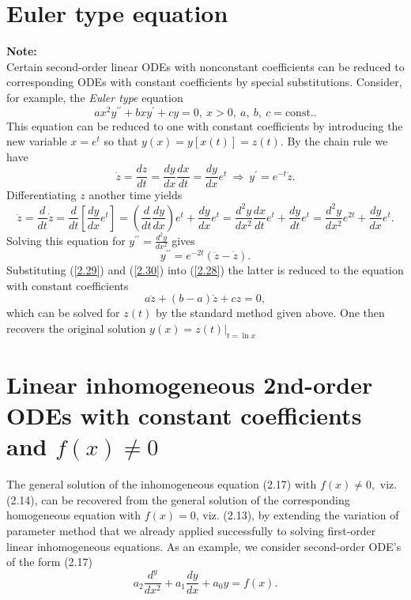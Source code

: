 \documentclass[11pt,a4paper]{article}
\begin{document}
	\mytitle
	\section{Euler type equation}
	\textbf{Note:}\\
	Certain second-order linear ODEs with nonconstant coefficients can be reduced to corresponding ODEs with constant coefficients by special substitutions. Consider, for example, the \textit{Euler type} equation
	\begin{equation}\label{2.28}
		ax^2y^{\prime\prime} + bxy^\prime +cy = 0,\ x>0,\ a,\ b,\ c = \text{const}..
	\end{equation}
	This equation can be reduced to one with constant coefficients by introducing the new variable $x = e^t$ so that $y(x) = y[x(t)] = z(t)$. By the chain rule we have
	\begin{equation}\label{2.29}
		\dot{z} = \frac{dz}{dt} = \frac{dy}{dx}\frac{dx}{dt} = \frac{dy}{dx}e^t\ \Rightarrow \ y^\prime = e^{-t}\dot{z}.
	\end{equation}
	Differentiating $z$ another time yields
	\begin{equation*}
		\ddot{z}
		= \frac{d}{dt}\dot{z}
		= \frac{d}{dt}\left[\frac{dy}{dx}e^t\right]
		= \left(\frac{d}{dt}\frac{dy}{dx}\right)e^t + \frac{dy}{dx}e^t
		= \frac{d^2y}{dx^2}\frac{dx}{dt}e^t + \frac{dy}{dt}e^t
		= \frac{d^2y}{dx^2}e^{2t}+\frac{dy}{dx}e^t.
	\end{equation*}
	Solving this equation for $y^{\prime\prime} = \frac{d^2y}{dx^2}$ gives
	\begin{equation}\label{2.30}
		y^{\prime\prime} = e^{-2t}(\ddot{z}-\dot{z}).
	\end{equation}
	Substituting (\ref{2.29}) and (\ref{2.30}) into (\ref{2.28}) the latter is reduced to the equation with constant coefficients
	\begin{equation}
		a\ddot{z} + (b-a)\dot{z} + cz=0,
	\end{equation}
	which can be solved for $z(t)$ by the standard method given above. One then recovers the original solution $y(x) = z(t)|_{t = \ln x}$
	\section{Linear inhomogeneous 2nd-order ODEs with constant coefficients and $f(x)\neq 0$}
	The general solution of the inhomogeneous equation (2.17) with $f(x)\neq 0,$ viz. (2.14), can be recovered from the general solution of the corresponding homogeneous equation with $f(x) = 0$, viz. (2.13), by extending the variation of parameter method that we already applied successfully to solving first-order linear inhomogeneous equations. As an example, we consider second-order ODE’s of the form (2.17)
	\begin{equation}\label{2.32}
		a_2\frac{d^y}{dx^2} + a_1\frac{dy}{dx}+a_0y = f(x).
	\end{equation}
\end{document}
